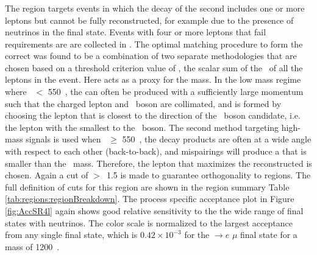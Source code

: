\subsubsection{\SRFour}
\label{sec:srfour}
The \SRFour region targets events in which the decay of the second \chono includes one or more leptons but cannot be fully reconstructed, for example due to the presence of neutrinos in the final state.
Events with four or more leptons that fail \SRTL requirements are are collected in \SRFour.
The optimal matching procedure to form the correct \mZl was found to be a combination of two separate methodologies that are chosen based on a threshold criterion value of \Lt, the scalar sum of the \pt\ of all the leptons in the event. 
Here \Lt acts as a proxy for the \chone mass.
In the low mass regime where \Lt\ $<$ 550~\GeV, the \chono can often be produced with a sufficiently large momentum such that the charged lepton and \Zboson\ boson are collimated, and \mZl is formed by choosing the lepton that is closest to the direction of the \Zboson\ boson candidate, i.e. the lepton with the smallest \dr to the \Zboson\ boson.
The second method targeting high-mass signals is used when \Lt\ $\geq$ 550~\GeV, the \chone decay products are often at a wide angle with respect to each other (back-to-back), and mispairings will produce a \mZl that is smaller than the \chone\ mass.
Therefore, the lepton that maximizes the reconstructed \mZl is chosen.
Again a cut of \dRbb$>$~1.5 is made to guarantee orthogonality to \ttZ regions.
The full definition of cuts for this region are shown in the region summary Table \ref{tab:regions:regionBreakdown}.
The process specific acceptance plot in Figure \ref{fig:AccSR4l} again shows good relative sensitivity to the the wide range of final states with neutrinos.
The color scale is normalized to the largest acceptance from any single final state, which is $0.42 \times 10^{-3}$ for the \CCsignal$\rightarrow$\Zboson$e$ \Zboson$\mu$ final state for a \chone mass of 1200~\GeV. 
